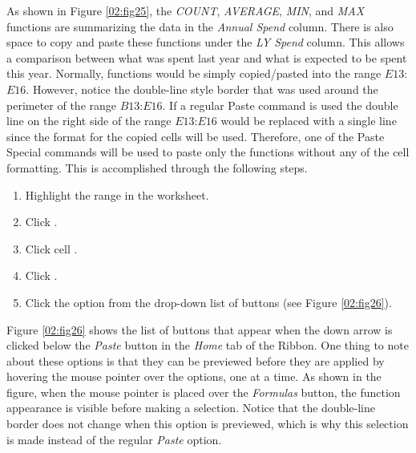 As shown in Figure \ref{02:fig25}, the \textit{COUNT}, \textit{AVERAGE}, \textit{MIN}, and \textit{MAX} functions are summarizing the data in the \textit{Annual Spend} column. There is also space to copy and paste these functions under the \textit{LY Spend} column. This allows a comparison between what was spent last year and what is expected to be spent this year. Normally, functions would be simply copied/pasted into the range $ E13 $:$ E16 $. However, notice the double-line style border that was used around the perimeter of the range $ B13 $:$ E16 $. If a regular Paste command is used the double line on the right side of the range $ E13 $:$ E16 $ would be replaced with a single line since the format for the copied cells will be used. Therefore, one of the Paste Special commands will be used to paste only the functions without any of the cell formatting. This is accomplished through the following steps.

\begin{enumerate}
	\item Highlight the range  in the  worksheet.
	\item Click .
	\item Click cell .
	\item Click .
	\item Click the  option from the drop-down list of buttons (see Figure \ref{02:fig26}).
\end{enumerate}

Figure \ref{02:fig26} shows the list of buttons that appear when the down arrow is clicked below the \textit{Paste} button in the \textit{Home} tab of the Ribbon. One thing to note about these options is that they can be previewed before they are applied by hovering the mouse pointer over the options, one at a time. As shown in the figure, when the mouse pointer is placed over the \textit{Formulas} button, the function appearance is visible before making a selection. Notice that the double-line border does not change when this option is previewed, which is why this selection is made instead of the regular \textit{Paste} option.

